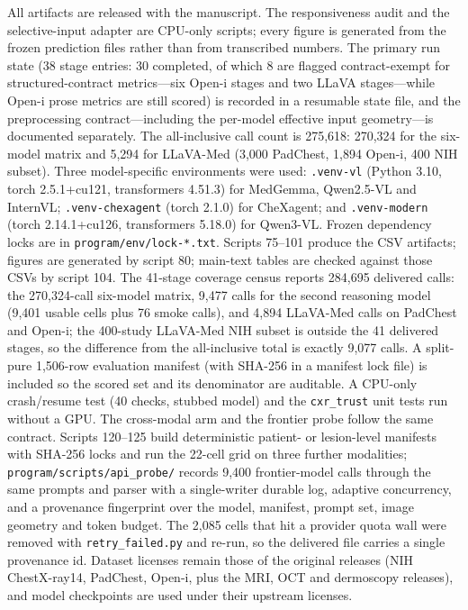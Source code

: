 All artifacts are released with the manuscript. The responsiveness audit and the selective-input adapter are CPU-only scripts; every figure is generated from the frozen prediction files rather than from transcribed numbers. The primary run state (38 stage entries: 30 completed, of which 8 are flagged contract-exempt for structured-contract metrics---six Open-i stages and two LLaVA stages---while Open-i prose metrics are still scored) is recorded in a resumable state file, and the preprocessing contract---including the per-model effective input geometry---is documented separately. The all-inclusive call count is 275,618: 270,324 for the six-model matrix and 5,294 for LLaVA-Med (3,000 PadChest, 1,894 Open-i, 400 NIH subset). Three model-specific environments were used: \texttt{.venv-vl} (Python 3.10, torch 2.5.1+cu121, transformers 4.51.3) for MedGemma, Qwen2.5-VL and InternVL; \texttt{.venv-chexagent} (torch 2.1.0) for CheXagent; and \texttt{.venv-modern} (torch 2.14.1+cu126, transformers 5.18.0) for Qwen3-VL. Frozen dependency locks are in \texttt{program/env/lock-*.txt}. Scripts 75--101 produce the CSV artifacts; figures are generated by script 80; main-text tables are checked against those CSVs by script 104. The 41-stage coverage census reports 284,695 delivered calls: the 270,324-call six-model matrix, 9,477 calls for the second reasoning model (9,401 usable cells plus 76 smoke calls), and 4,894 LLaVA-Med calls on PadChest and Open-i; the 400-study LLaVA-Med NIH subset is outside the 41 delivered stages, so the difference from the all-inclusive total is exactly 9,077 calls. A split-pure 1,506-row evaluation manifest (with SHA-256 in a manifest lock file) is included so the scored set and its denominator are auditable. A CPU-only crash/resume test (40 checks, stubbed model) and the \texttt{cxr\_trust} unit tests run without a GPU. The cross-modal arm and the frontier probe follow the same contract. Scripts 120--125 build deterministic patient- or lesion-level manifests with SHA-256 locks and run the 22-cell grid on three further modalities; \texttt{program/scripts/api\_probe/} records 9,400 frontier-model calls through the same prompts and parser with a single-writer durable log, adaptive concurrency, and a provenance fingerprint over the model, manifest, prompt set, image geometry and token budget. The 2,085 cells that hit a provider quota wall were removed with \texttt{retry\_failed.py} and re-run, so the delivered file carries a single provenance id. Dataset licenses remain those of the original releases (NIH ChestX-ray14, PadChest, Open-i, plus the MRI, OCT and dermoscopy releases), and model checkpoints are used under their upstream licenses.
